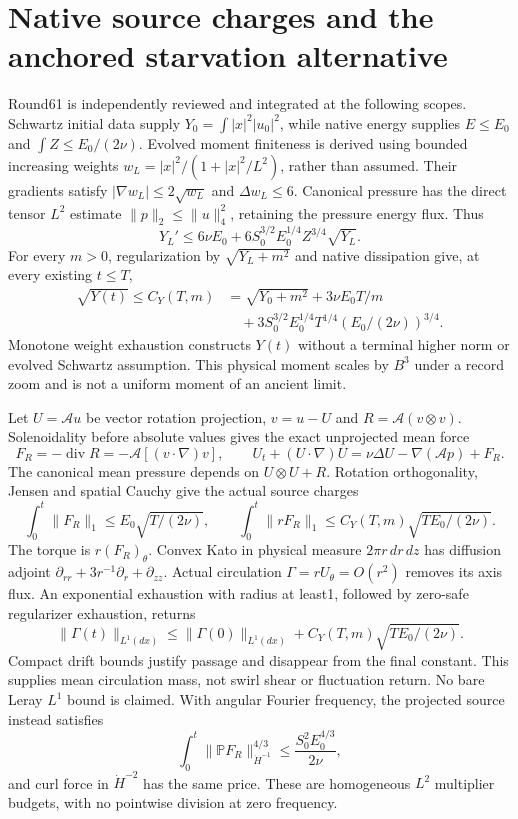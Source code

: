 \documentclass[11pt]{article}
\begin{document}
\section{Native source charges and the anchored starvation alternative}
\label{sec:native-anchor61}

Round61 is independently reviewed and integrated at the following scopes.
Schwartz initial data supply $Y_0=\int|x|^2|u_0|^2$, while native energy
supplies $E\le E_0$ and $\int Z\le E_0/(2\nu)$. Evolved moment finiteness
is derived using bounded increasing weights
$w_L=|x|^2/(1+|x|^2/L^2)$, rather than assumed. Their gradients satisfy
$|\nabla w_L|\le2\sqrt{w_L}$ and $\Delta w_L\le6$.
Canonical pressure has the direct tensor $L^2$ estimate
$\|p\|_2\le\|u\|_4^2$, retaining the pressure energy flux. Thus
\[
 Y_L'\le6\nu E_0+6S_0^{3/2}E_0^{1/4}Z^{3/4}\sqrt{Y_L}.
\]
For every $m>0$, regularization by $\sqrt{Y_L+m^2}$ and native dissipation
give, at every existing $t\le T$,
\[
 \begin{aligned}
 \sqrt{Y(t)}\le C_Y(T,m)&=\sqrt{Y_0+m^2}+3\nu E_0T/m\\
 &\quad+3S_0^{3/2}E_0^{1/4}T^{1/4}(E_0/(2\nu))^{3/4}.
 \end{aligned}
\]
Monotone weight exhaustion constructs $Y(t)$ without a terminal higher
norm or evolved Schwartz assumption. This physical moment scales by $B^3$
under a record zoom and is not a uniform moment of an ancient limit.

Let $U=\mathcal A u$ be vector rotation projection, $v=u-U$ and
$R=\mathcal A(v\otimes v)$. Solenoidality before absolute values gives
the exact unprojected mean force
\[
 F_R=-\operatorname{div}R=-\mathcal A[(v\cdot\nabla)v],
 \qquad U_t+(U\cdot\nabla)U=\nu\Delta U-\nabla(\mathcal A p)+F_R.
\]
The canonical mean pressure depends on $U\otimes U+R$. Rotation
orthogonality, Jensen and spatial Cauchy give the actual source charges
\[
 \int_0^t\|F_R\|_1\le E_0\sqrt{T/(2\nu)},
 \qquad\int_0^t\|rF_R\|_1\le C_Y(T,m)\sqrt{TE_0/(2\nu)}.
\]
The torque is $r(F_R)_\theta$. Convex Kato in physical measure
$2\pi r\,dr\,dz$ has diffusion adjoint
$\partial_{rr}+3r^{-1}\partial_r+\partial_{zz}$.
Actual circulation $\Gamma=rU_\theta=O(r^2)$ removes its axis flux.
An exponential exhaustion with radius at least1, followed by zero-safe
regularizer exhaustion, returns
\[
 \|\Gamma(t)\|_{L^1(dx)}\le\|\Gamma(0)\|_{L^1(dx)}
                         +C_Y(T,m)\sqrt{TE_0/(2\nu)}.
\]
Compact drift bounds justify passage and disappear from the final constant.
This supplies mean circulation mass, not swirl shear or fluctuation return.
No bare Leray $L^1$ bound is claimed. With angular Fourier frequency,
the projected source instead satisfies
\[
 \int_0^t\|\mathbb P F_R\|_{\dot H^{-1}}^{4/3}
 \le\frac{S_0^2E_0^{4/3}}{2\nu},
\]
and curl force in $\dot H^{-2}$ has the same price. These are homogeneous
$L^2$ multiplier budgets, with no pointwise division at zero frequency.
\end{document}
